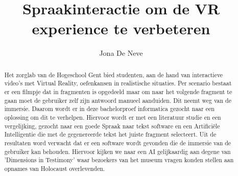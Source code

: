 \documentclass{hogent-article}
\title{Spraakinteractie om de VR experience te verbeteren}
\author{Jona De Neve}
\begin{document}
\begin{abstract}

Het zorglab van de Hogeschool Gent bied studenten, aan de hand van interactieve video's met Virtual Reality, oefenkansen in realistische situaties. Per scenario bestaat er een filmpje dat in fragmenten is opgedeeld maar om naar het volgende fragment te gaan moet de gebruiker zelf zijn antwoord manueel aanduiden. Dit neemt weg van de immersie. Daarom wordt er in deze bachelorproef informatica gezocht naar een oplossing om dit te verhelpen. Hiervoor wordt er met een literatuur studie en een vergelijking, gezocht naar een goede Spraak naar tekst software en een Artificiële Intelligentie die met de gegenereerde tekst het juiste fragment selecteert. Uit de resultaten word verwacht dat er een software wordt gevonden die de immersie van de gebruiker kan behouden. Hiervoor kijken we naar een AI gelijkaardig aan degene van 'Dimensions in Testimony' waar bezoekers van het museum vragen konden stellen aan opnames van Holocaust overlevenden.

\end{abstract}

\tableofcontents



\printbibliography[heading=bibintoc]
\end{document}
